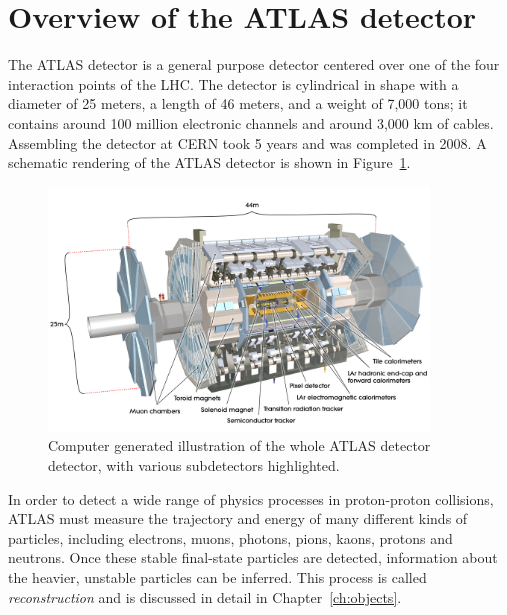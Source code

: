 \section{Overview of the ATLAS detector}
The ATLAS detector is a general purpose detector centered over one of the four interaction points of the LHC. The detector is cylindrical in shape with a diameter of 25 meters, a length of 46 meters, and a weight of 7,000 tons; it contains around 100 million electronic channels and around 3,000 km of cables. Assembling the detector at CERN took 5 years and was completed in 2008. A schematic rendering of the ATLAS detector is shown in Figure~\ref{fig:atlas-cgi}.
\begin{figure}[tp]
  \centering
  \includegraphics[width=0.90\textwidth]{fig/atlas/atlaspic.jpg}
  \caption{Computer generated illustration of the whole ATLAS detector detector, with various subdetectors highlighted\cite{Pequenao:1095924}.}
  \label{fig:atlas-cgi}
\end{figure}
In order to detect a wide range of physics processes in proton-proton collisions, ATLAS must measure the trajectory and energy of many different kinds of particles, including electrons, muons, photons, pions, kaons, protons and neutrons. Once these stable final-state particles are detected, information about the heavier, unstable particles can be inferred. This process is called \emph{reconstruction} and is discussed in detail in Chapter~\ref{ch:objects}.

